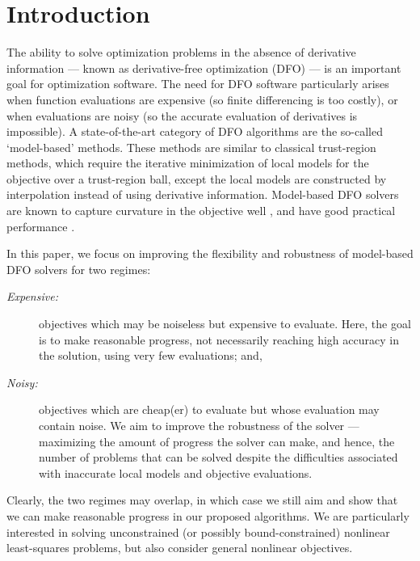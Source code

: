 
\section{Introduction}

The ability to solve optimization problems in the absence of derivative information --- known as derivative-free optimization (DFO) --- is an important goal for optimization software.
The need for DFO software particularly arises when function evaluations are expensive (so finite differencing is too costly), or when evaluations are noisy (so the accurate evaluation of derivatives is impossible).
A state-of-the-art  category of DFO algorithms are the so-called `model-based' methods.
These methods are similar to classical trust-region methods, which require the iterative minimization of local models for the objective over a trust-region ball, except the local models are constructed by interpolation instead of using derivative information.
Model-based DFO solvers are known to capture curvature in the objective well \cite{Custodio2017}, and have good practical performance \cite{More2009}.

In this paper, we focus on improving the flexibility and robustness of model-based DFO solvers for two regimes: 
\begin{description}
	\item[\normalfont\textit{Expensive:}] objectives which may be noiseless but expensive to evaluate. Here, the goal is to make reasonable progress, not necessarily reaching high accuracy in the
solution, using very few evaluations; and,
	\item[\normalfont\textit{Noisy:}] objectives which are cheap(er) to evaluate but whose evaluation may contain noise. We aim to improve the robustness of the solver --- maximizing the amount of progress the solver can make, and hence, the number of problems that can be solved despite the difficulties associated with inaccurate local models and objective evaluations.
\end{description}
Clearly, the two regimes may overlap, in which case we still aim and show that we can make reasonable progress in our proposed algorithms.
We are particularly interested in solving unconstrained (or possibly bound-constrained) nonlinear least-squares problems, but also consider general nonlinear objectives.

